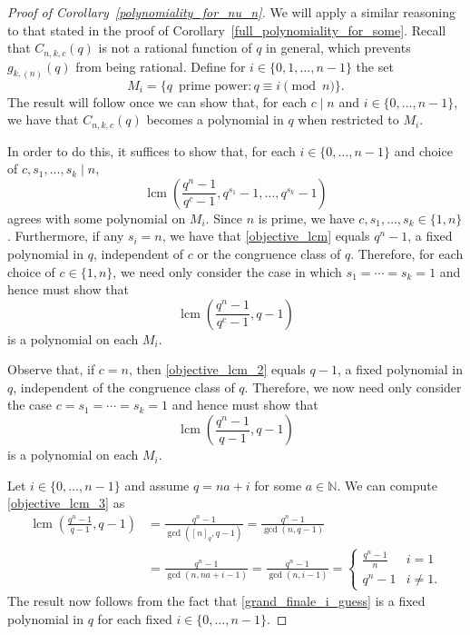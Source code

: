 \documentclass[Unicode,ALCO]{cedram}
\DeclareMathOperator{\lcm}{lcm}
\newcommand{\N}{\mathbb{N}}
\begin{document}
\begin{proof}[Proof of Corollary~\ref{polynomiality_for_nu_n}]
We will apply a similar reasoning to that stated in the proof of Corollary~\ref{full_polynomiality_for_some}.
Recall that \(C_{n,k,c}(q)\) is not a rational function of \(q\) in general,
which prevents \(g_{k,(n)} (q)\) from being rational.
Define for \(i \in \{0,1,\ldots,n-1\}\) the set
\begin{equation}
M_i = \{ q \, \text{ prime power} : q \equiv i \pmod{n}\}.
\end{equation}
The result will follow once we can show that, for each \(c \mid n\) and \(i \in \{0,\ldots,n-1\}\), we have that \(C_{n,k,c}(q)\) becomes a polynomial in \(q\) when restricted to \(M_i\).

In order to do this, it suffices to show that, for each \(i \in \{0,\ldots,n-1\}\) and choice of \(c, s_1,\ldots,s_k \mid n\),
\begin{equation}
\label{objective_lcm}
\lcm
\left (
\frac{q^n-1}{q^c-1},
q^{s_1} - 1,
\ldots,
q^{s_k} - 1
\right )
\end{equation}
agrees with some polynomial on \(M_i\).
Since \(n\) is prime, we have \(c,s_1,\ldots,s_k \in \{1,n\}\).
Furthermore, if any \(s_i = n\), we have that \eqref{objective_lcm} equals \(q^n-1\), a fixed polynomial in \(q\),
independent of \(c\) or the congruence class of \(q\).
Therefore, for each choice of \(c \in \{1,n\}\), we need only consider the case in which \(s_1 = \cdots = s_k = 1\) and hence must show that
\begin{equation}
\label{objective_lcm_2}
\lcm
\left (
\frac{q^n-1}{q^c-1},
q - 1
\right )
\end{equation}
is a polynomial on each \(M_i\).

Observe that, if \(c = n\), then \eqref{objective_lcm_2} equals \(q-1\), a fixed polynomial in \(q\), independent of the congruence class of \(q\).
Therefore, we now need only consider the case \(c = s_1 = \cdots = s_k = 1\) and hence must show that
\begin{equation}
\label{objective_lcm_3}
\lcm
\left (
\frac{q^n-1}{q-1},
q - 1
\right )
\end{equation}
is a polynomial on each \(M_i\).

Let \(i \in \{0,\ldots,n-1\}\)
and assume \(q = na + i\) for some \(a \in \N\).
We can compute \eqref{objective_lcm_3} as
\begin{align}
\lcm
\left (
\frac{q^n-1}{q-1},
q-1
\right )
& =
\frac{q^n-1}{
\gcd
\left (
[n]_q, q-1
\right )
}
=
\frac{q^n-1}{
\gcd \left (
n,q-1
\right )
} \nonumber \\
& =
\frac{q^n-1}{\gcd(n,na+i-1)}
= \frac{q^n-1}{\gcd(n,i-1)}
=
\begin{cases}
\frac{q^n-1}{n} & i=1 \\
q^n-1           & i \neq 1.
\end{cases}
\label{grand_finale_i_guess}
\end{align}
The result now follows from the fact that \eqref{grand_finale_i_guess} is a fixed polynomial in \(q\) for each fixed \(i \in \{0,\ldots,n-1\}\).
\end{proof}
\end{document}
